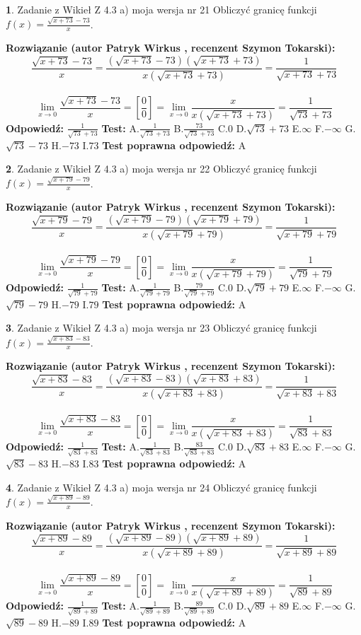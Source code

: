 \documentclass[12pt, a4paper]{article}
\theoremstyle{definition} %
\newtheorem{zad}{}
\newcommand{\zadStart}[1]{\begin{zad}#1\newline}
\newcommand{\zadStop}{\end{zad}}
\newcommand{\rozwStart}[2]{\noindent \textbf{Rozwiązanie (autor #1 , recenzent #2): }\newline}
\newcommand{\rozwStop}{\newline}
\newcommand{\odpStart}{\noindent \textbf{Odpowiedź:}\newline}
\newcommand{\odpStop}{\newline}
\newcommand{\testStart}{\noindent \textbf{Test:}\newline}
\newcommand{\testStop}{\newline}
\newcommand{\kluczStart}{\noindent \textbf{Test poprawna odpowiedź:}\newline}
\newcommand{\kluczStop}{\newline}
\begin{document}
\zadStart{Zadanie z Wikieł Z 4.3 a) moja wersja nr 21}
Obliczyć granicę funkcji $f(x)=\frac{\sqrt{x+73}-73}{x}$.
\zadStop
\rozwStart{Patryk Wirkus}{Szymon Tokarski}
$$\frac{\sqrt{x+73}-73}{x}=\frac{(\sqrt{x+73}-73)(\sqrt{x+73}+73)}{x(\sqrt{x+73}+73)}=\frac{1}{\sqrt{x+73}+73}$$
\\
$$\lim\limits_{x\to0}\frac{\sqrt{x+73}-73}{x}=[\frac{0}{0}]=
\lim\limits_{x\to0}\frac{x}{x(\sqrt{x+73}+73)} = \frac{1}{\sqrt{73}+73}$$
\rozwStop
\odpStart
$\frac{1}{\sqrt{73}+73}$
\odpStop
\testStart
A.$\frac{1}{\sqrt{73}+73}$
B.$\frac{73}{\sqrt{73}+73}$
C.$0$
D.$\sqrt{73}+73$
E.$\infty$
F.$-\infty$
G.$\sqrt{73}-73$
H.$-73$
I.$73$
\testStop
\kluczStart
A
\kluczStop



\zadStart{Zadanie z Wikieł Z 4.3 a) moja wersja nr 22}
Obliczyć granicę funkcji $f(x)=\frac{\sqrt{x+79}-79}{x}$.
\zadStop
\rozwStart{Patryk Wirkus}{Szymon Tokarski}
$$\frac{\sqrt{x+79}-79}{x}=\frac{(\sqrt{x+79}-79)(\sqrt{x+79}+79)}{x(\sqrt{x+79}+79)}=\frac{1}{\sqrt{x+79}+79}$$
\\
$$\lim\limits_{x\to0}\frac{\sqrt{x+79}-79}{x}=[\frac{0}{0}]=
\lim\limits_{x\to0}\frac{x}{x(\sqrt{x+79}+79)} = \frac{1}{\sqrt{79}+79}$$
\rozwStop
\odpStart
$\frac{1}{\sqrt{79}+79}$
\odpStop
\testStart
A.$\frac{1}{\sqrt{79}+79}$
B.$\frac{79}{\sqrt{79}+79}$
C.$0$
D.$\sqrt{79}+79$
E.$\infty$
F.$-\infty$
G.$\sqrt{79}-79$
H.$-79$
I.$79$
\testStop
\kluczStart
A
\kluczStop



\zadStart{Zadanie z Wikieł Z 4.3 a) moja wersja nr 23}
Obliczyć granicę funkcji $f(x)=\frac{\sqrt{x+83}-83}{x}$.
\zadStop
\rozwStart{Patryk Wirkus}{Szymon Tokarski}
$$\frac{\sqrt{x+83}-83}{x}=\frac{(\sqrt{x+83}-83)(\sqrt{x+83}+83)}{x(\sqrt{x+83}+83)}=\frac{1}{\sqrt{x+83}+83}$$
\\
$$\lim\limits_{x\to0}\frac{\sqrt{x+83}-83}{x}=[\frac{0}{0}]=
\lim\limits_{x\to0}\frac{x}{x(\sqrt{x+83}+83)} = \frac{1}{\sqrt{83}+83}$$
\rozwStop
\odpStart
$\frac{1}{\sqrt{83}+83}$
\odpStop
\testStart
A.$\frac{1}{\sqrt{83}+83}$
B.$\frac{83}{\sqrt{83}+83}$
C.$0$
D.$\sqrt{83}+83$
E.$\infty$
F.$-\infty$
G.$\sqrt{83}-83$
H.$-83$
I.$83$
\testStop
\kluczStart
A
\kluczStop



\zadStart{Zadanie z Wikieł Z 4.3 a) moja wersja nr 24}
Obliczyć granicę funkcji $f(x)=\frac{\sqrt{x+89}-89}{x}$.
\zadStop
\rozwStart{Patryk Wirkus}{Szymon Tokarski}
$$\frac{\sqrt{x+89}-89}{x}=\frac{(\sqrt{x+89}-89)(\sqrt{x+89}+89)}{x(\sqrt{x+89}+89)}=\frac{1}{\sqrt{x+89}+89}$$
\\
$$\lim\limits_{x\to0}\frac{\sqrt{x+89}-89}{x}=[\frac{0}{0}]=
\lim\limits_{x\to0}\frac{x}{x(\sqrt{x+89}+89)} = \frac{1}{\sqrt{89}+89}$$
\rozwStop
\odpStart
$\frac{1}{\sqrt{89}+89}$
\odpStop
\testStart
A.$\frac{1}{\sqrt{89}+89}$
B.$\frac{89}{\sqrt{89}+89}$
C.$0$
D.$\sqrt{89}+89$
E.$\infty$
F.$-\infty$
G.$\sqrt{89}-89$
H.$-89$
I.$89$
\testStop
\kluczStart
A
\kluczStop
\end{document}
